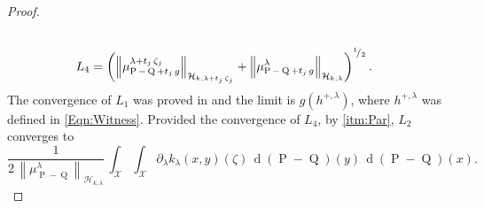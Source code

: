 \begin{proof}
\begin{equation}
\begin{aligned}
						\\
						L_{4}&=\left(\left\|\mu_{\operatorname{P}-\operatorname{Q}+t_{j}\,g}^{\lambda+t_{j}\,\zeta_{j}}\right\|_{\mathcal{H}_{k,\lambda+t_{j}\,\zeta_{j}}}+\left\|\mu_{\operatorname{P}-\operatorname{Q}+t_{j}\,g}^{\lambda}\right\|_{\mathcal{H}_{k,\lambda}}\right)^{^{1}\!/_{2}}.
					\end{aligned}
				\end{equation}
				The convergence of $L_{1}$ was proved in \textcite[Lemma 4]{Carcamo2024} and the limit is $g\left(h^{+,\lambda}\right)$, where $h^{+,\lambda}$ was defined in \eqref{Eqn:Witness}. Provided the convergence of $L_{4}$, by \ref{itm:Par}, $L_{2}$ converges to
				\begin{equation}
					\frac{1}{2\,\left\|\mu_{\operatorname{P}-\operatorname{Q}}^{\lambda}\right\|_{\mathcal{H}_{k,\lambda}}}\,\int_{\mathcal{X}}\int_{\mathcal{X}}\partial_{\lambda}k_{\lambda}(x,y)(\zeta)\,\operatorname{d}(\operatorname{P}-\operatorname{Q})(y)\,\operatorname{d}(\operatorname{P}-\operatorname{Q})(x).
				\end{equation}
				

\end{proof}
